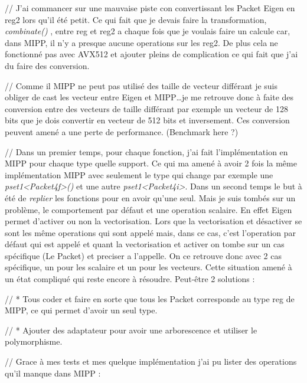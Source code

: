 // J'ai commancer sur une mauvaise piste con convertissant les Packet Eigen en reg2
lors qu'il été petit. Ce qui fait que je devais faire la transformation, \emph{combinate()}
, entre reg et reg2 a chaque fois que je voulais faire un calcule car, dans MIPP, il
n'y a presque aucune operations sur les reg2. De plus cela ne fonctionné pas avec AVX512
et ajouter pleins de complication ce qui fait que j'ai du faire des conversion.

// Comme il MIPP ne peut pas utilisé des taille de vecteur différant je suis obliger de
cast les vecteur entre Eigen et MIPP\dots je me retrouve donc à faite des conversion
entre des vecteurs de taille différant par exemple un vecteur de 128 bits que je dois
convertir en vecteur de 512 bits et inversement. Ces conversion peuvent amené a une
perte de performance. (Benchmark here ?)

// Dans un premier temps, pour chaque fonction, j'ai fait l'implémentation en MIPP pour
chaque type quelle support. Ce qui ma amené à avoir 2 fois la même implémentation MIPP
avec seulement le type qui change par exemple une \emph{pset1<Packet4f>()} et une autre
\emph{pset1<Packet4i>}. Dans un second temps le but à été de \textit{replier} les
fonctions pour en avoir qu'une seul. Mais je suis tombés sur un problème, le
comportement par défaut et une operation scalaire. En effet Eigen permet d'activer
ou non la vectorisation. Lors que la vectorisation et désactiver se sont les même
operations qui sont appelé mais, dans ce cas, c'est l'operation par défaut qui est
appelé et quant la vectorisation et activer on tombe sur un cas spécifique (Le Packet)
et preciser a l'appelle. On ce retrouve donc avec 2 cas spécifique, un pour les scalaire
et un pour les vecteurs. Cette situation amené à un état compliqué qui reste encore à
résoudre. Peut-être 2 solutions :

// * Tous coder et faire en sorte que tous les Packet corresponde au type reg de MIPP,
ce qui permet d'avoir un seul type.

// * Ajouter des adaptateur pour avoir une arborescence et utiliser le polymorphisme.

// Grace à mes tests et mes quelque implémentation j'ai pu lister des operations qu'il
manque dans MIPP :

